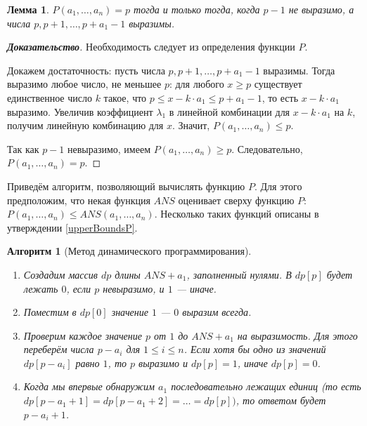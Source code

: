 \documentclass[12pt]{article}
\newtheorem{lemma}[theorem]{Лемма}
\newtheorem{algorithm}[theorem]{Алгоритм}
\begin{document}
\begin{lemma}
\label{algorithm1:lemma2}
$P(a_1, \dots, a_n) = p$ тогда и только тогда, когда $p - 1$ не выразимо, а числа $p, p + 1, \dots, p + a_1 - 1$ выразимы.
\end{lemma}
\begin{proof}[\textbf{Доказательство}]
Необходимость следует из определения функции $P$.

Докажем достаточность: пусть числа $p, p + 1, \dots, p + a_1 - 1$ выразимы. Тогда выразимо любое число, не меньшее $p$: для любого $x \ge p$ существует единственное число $k$ такое, что $p \le x - k \cdot a_1 \le p + a_1 - 1$, то есть $x - k \cdot a_1$ выразимо. Увеличив коэффициент $\lambda_1$ в линейной комбинации для $x - k \cdot a_1$ на $k$, получим линейную комбинацию для $x$. Значит, $P(a_1, \dots, a_n) \le p$.

Так как $p - 1$ невыразимо, имеем $P(a_1, \dots, a_n) \ge p$. Следовательно, $P(a_1, \dots, a_n) = p$.
\end{proof}

Приведём алгоритм, позволяющий вычислять функцию $P$. Для этого предположим, что некая функция $ANS$ оценивает сверху функцию $P$: $P(a_1, \dots, a_n) \le ANS(a_1, \dots, a_n)$. Несколько таких функций описаны в утверждении \ref{upperBoundsP}.

\begin{algorithm}[Метод динамического программирования] { \ }
\label{algorithm1}
\begin{enumerate}
    \item Создадим массив $dp$ длины $ANS + a_1$, заполненный нулями. В $dp[p]$ будет лежать $0$, если $p$ невыразимо, и $1$ --- иначе.
    \item Поместим в $dp[0]$ значение $1$ --- $0$ выразим всегда.
    \item Проверим каждое значение $p$ от $1$ до $ANS + a_1$ на выразимость. Для этого переберём числа $p - a_i$ для $1 \le i \le n$. Если хотя бы одно из значений $dp[p - a_i]$ равно $1$, то $p$ выразимо и $dp[p] = 1$, иначе $dp[p] = 0$.
    \item Когда мы впервые обнаружим $a_1$ последовательно лежащих единиц (то есть\\  $dp[p - a_1 + 1] = dp[p - a_1 + 2] = \dots = dp[p])$, то ответом будет $p - a_i + 1$. 
\end{enumerate}
\end{algorithm}
\end{document}
